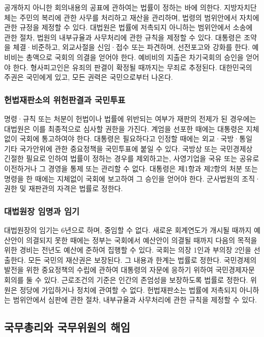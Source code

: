 \documentclass[doctor, korean]{pnuthesis}
\begin{document}
공개하지 아니한 회의내용의 공표에 관하여는 법률이 정하는 바에 의한다. 지방자치단체는 주민의 복리에 관한 사무를 처리하고 재산을 관리하며, 법령의 범위안에서 자치에 관한 규정을 제정할 수 있다. 대법원은 법률에 저촉되지 아니하는 범위안에서 소송에 관한 절차, 법원의 내부규율과 사무처리에 관한 규칙을 제정할 수 있다. 대통령은 조약을 체결·비준하고, 외교사절을 신임·접수 또는 파견하며, 선전포고와 강화를 한다. 예비비는 총액으로 국회의 의결을 얻어야 한다. 예비비의 지출은 차기국회의 승인을 얻어야 한다. 형사피고인은 유죄의 판결이 확정될 때까지는 무죄로 추정된다. 대한민국의 주권은 국민에게 있고, 모든 권력은 국민으로부터 나온다.

\subsubsection{헌법재판소의 위헌판결과 국민투표}

명령·규칙 또는 처분이 헌법이나 법률에 위반되는 여부가 재판의 전제가 된 경우에는 대법원은 이를 최종적으로 심사할 권한을 가진다. 계엄을 선포한 때에는 대통령은 지체없이 국회에 통고하여야 한다. 대통령은 필요하다고 인정할 때에는 외교·국방·통일 기타 국가안위에 관한 중요정책을 국민투표에 붙일 수 있다. 국방상 또는 국민경제상 긴절한 필요로 인하여 법률이 정하는 경우를 제외하고는, 사영기업을 국유 또는 공유로 이전하거나 그 경영을 통제 또는 관리할 수 없다. 대통령은 제1항과 제2항의 처분 또는 명령을 한 때에는 지체없이 국회에 보고하여 그 승인을 얻어야 한다. 군사법원의 조직·권한 및 재판관의 자격은 법률로 정한다.

\subsubsection{대법원장 임명과 임기}

대법원장의 임기는 6년으로 하며, 중임할 수 없다. 새로운 회계연도가 개시될 때까지 예산안이 의결되지 못한 때에는 정부는 국회에서 예산안이 의결될 때까지 다음의 목적을 위한 경비는 전년도 예산에 준하여 집행할 수 있다. 국회는 의장 1인과 부의장 2인을 선출한다. 모든 국민의 재산권은 보장된다. 그 내용과 한계는 법률로 정한다. 국민경제의 발전을 위한 중요정책의 수립에 관하여 대통령의 자문에 응하기 위하여 국민경제자문회의를 둘 수 있다. 근로조건의 기준은 인간의 존엄성을 보장하도록 법률로 정한다. 위원은 정당에 가입하거나 정치에 관여할 수 없다. 헌법재판소는 법률에 저촉되지 아니하는 범위안에서 심판에 관한 절차, 내부규율과 사무처리에 관한 규칙을 제정할 수 있다.

\subsection{국무총리와 국무위원의 해임}
\end{document}
